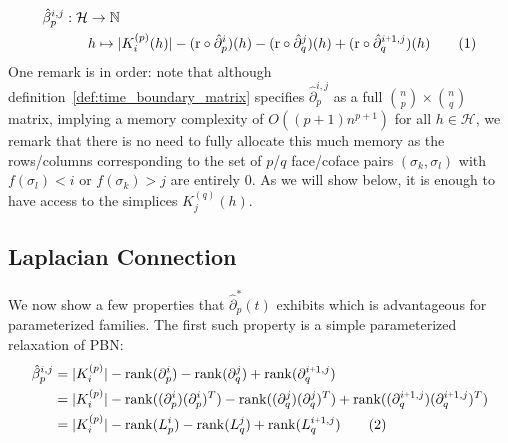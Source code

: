 \documentclass[10pt]{article}
\newcommand{\+}{%
	\raisebox{0.18ex}{\scaleobj{0.55}{+}}
}
\newcommand\numberthis{\addtocounter{equation}{1}\tag{\theequation}}
\begin{document}
\begin{align*}\label{eq:pbn_parameterized}
	\hat{\beta}_p^{i,j} : \mathcal{H} &\to \mathbb{N} \\
	& h\mapsto \lvert K_i^{(p)}(h) \rvert  -  (\mathrm{r} \circ \hat{\partial}_{p}^{i})(h) - (\mathrm{r} \circ \hat{\partial}_{q}^{j})(h) + (\mathrm{r} \circ \hat{\partial}_{q}^{i \+ 1, j})(h) \numberthis
\end{align*}
One remark is in order: note that although definition~\ref{def:time_boundary_matrix} specifies $\hat{\partial}_p^{i,j}$ as a full $\binom{n}{p} \times \binom{n}{q}$ matrix, implying a memory complexity of $O((p+1) n^{p+1})$ for all $h \in \mathcal{H}$, we remark that there is no need to fully allocate this much memory as the rows/columns corresponding to the set of $p$/$q$ face/coface pairs $(\sigma_k, \sigma_l)$ with $f(\sigma_l) < i$ or $f(\sigma_k) > j$ are entirely $0$. 
As we will show below, it is enough to have access to the simplices $K_j^{(q)}(h)$. %

\subsection{Laplacian Connection}
We now show a few properties that $\hat{\partial}_p^{\ast}(t)$ exhibits which is advantageous for parameterized families. 
The first such property is a simple parameterized relaxation of PBN:
\begin{align*}
	\hat{\beta}_p^{i,j} &= \lvert K_i^{(p)} \rvert - \mathrm{rank}(\partial_{p}^{i}) - \mathrm{rank}(\partial_{q}^{j}) + \mathrm{rank}(\partial_{q}^{i \+ 1, j} ) \\
&= \lvert K_i^{(p)} \rvert - \mathrm{rank}((\partial_{p}^{i})(\partial_{p}^{i})^T) - \mathrm{rank}((\partial_{q}^{j})(\partial_{q}^{j})^T) + \mathrm{rank}( (\partial_{q}^{i \+ 1, j})(\partial_{q}^{i \+ 1, j})^T)\\
&= \lvert K_i^{(p)} \rvert - \mathrm{rank}(L_p^i) - \mathrm{rank}(L_q^j) + \mathrm{rank}(L_q^{i\+1,j}) \numberthis
\end{align*}

\end{document}
